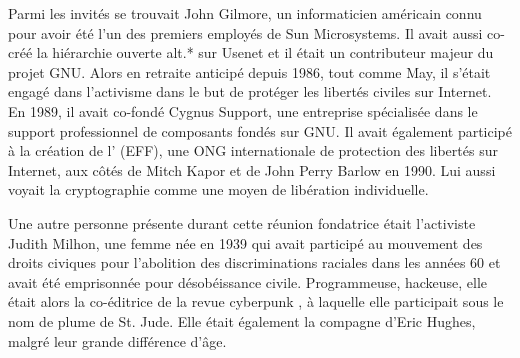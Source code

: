 Parmi les invités se trouvait John Gilmore, un informaticien américain connu pour avoir été l'un des premiers employés de Sun Microsystems. Il avait aussi co-créé la hiérarchie ouverte alt.* sur Usenet et il était un contributeur majeur du projet GNU. Alors en retraite anticipé depuis 1986, tout comme May, il s'était engagé dans l'activisme dans le but de protéger les libertés civiles sur Internet. En 1989, il avait co-fondé Cygnus Support, une entreprise spécialisée dans le support professionnel de composants fondés sur GNU. Il avait également participé à la création de l' (EFF), une ONG internationale de protection des libertés sur Internet, aux côtés de Mitch Kapor et de John Perry Barlow en 1990. Lui aussi voyait la cryptographie comme une moyen de libération individuelle. %

Une autre personne présente durant cette réunion fondatrice était l'activiste Judith Milhon, une femme née en 1939 qui avait participé au mouvement des droits civiques pour l'abolition des discriminations raciales dans les années 60 et avait été emprisonnée pour désobéissance civile. Programmeuse, hackeuse, elle était alors la co-éditrice de la revue cyberpunk , à laquelle elle participait sous le nom de plume de St. Jude. Elle était également la compagne d'Eric Hughes, malgré leur grande différence d'âge.

